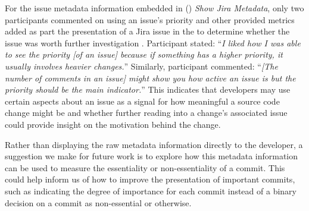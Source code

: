 For the issue metadata information embedded in () \textit{Show Jira Metadata},
only two participants commented on using an issue's priority and other provided metrics added as part the presentation
of a Jira issue in the  to determine whether the issue was worth further investigation .
Participant  stated: 
``\textit{I liked how I was able to see the priority [of an issue] because if something has a higher priority, it usually involves heavier changes.}''
Similarly, participant  commented:
``\textit{[The number of comments in an issue] might show you how active an issue is but the priority should be the main indicator.}''
This indicates that developers may use certain aspects about an issue as a signal 
for how meaningful a source code change might be and whether further reading into a change's associated issue
could provide insight on the motivation behind the change.

Rather than displaying the raw metadata information directly to the developer,
a suggestion we make for future work is to explore how this metadata information
can be used to measure the essentiality or non-essentiality of a commit.
This could help inform us of how to improve the presentation of important
commits, such as indicating the degree of importance for each commit 
instead of a binary decision on a commit as non-essential or otherwise.

\endinput

Any text after an \endinput is ignored.
You could put scraps here or things in progress.